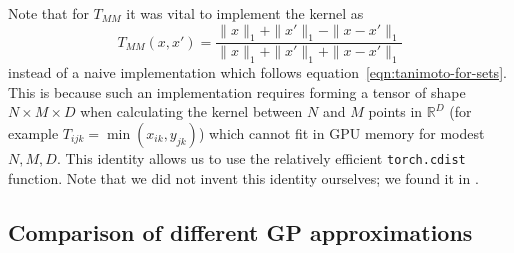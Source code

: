 \documentclass{article}
\theoremstyle{plain}
\theoremstyle{definition}
\theoremstyle{remark}
\begin{document}
Note that for $T_{MM}$ it was vital to implement the kernel as
\begin{equation}\label{eqn:minmax-using-l1-distance}
    T_{MM}(x, x') = \frac{\|x\|_1+\|x'\|_1 - \|x-x'\|_1}{\|x\|_1+\|x'\|_1 + \|x-x'\|_1}
\end{equation}
instead of a naive implementation which follows equation~\ref{eqn:tanimoto-for-sets}.
This is because such an implementation requires forming a tensor of shape $N\times M \times D$
when calculating the kernel between $N$ and $M$ points in $\mathbb{R}^D$
(for example $T_{ijk}=\min(x_{ik}, y_{jk})$)
which cannot fit in GPU memory for modest $N,M,D$.
This identity allows us to use the relatively efficient \texttt{torch.cdist} function.
Note that we did not invent this identity ourselves;
we found it in \citet{ioffe2010improved}.

\subsection{Comparison of different GP approximations}\label{apdx:different GP approximations expt}
\end{document}
